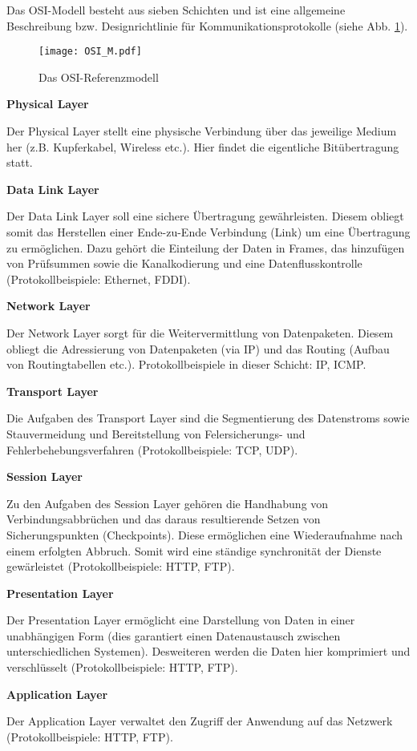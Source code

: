 Das OSI-Modell besteht aus sieben Schichten und ist eine allgemeine Beschreibung
bzw. Designrichtlinie f{\"u}r Kommunikationsprotokolle (siehe Abb.
\ref{fig:OSI_M}).

\begin{figure}[H]
\centering
\texttt{[image: OSI\_M.pdf]}
\caption{Das OSI-Referenzmodell}
\label{fig:OSI_M}
\end{figure}

\textbf{Physical Layer}

Der Physical Layer stellt eine physische Verbindung {\"u}ber das jeweilige
Medium her (z.B. Kupferkabel, Wireless etc.). Hier findet die eigentliche
Bit{\"u}bertragung statt.

\textbf{Data Link Layer}

Der Data Link Layer soll eine sichere {\"U}bertragung gew{\"a}hrleisten. Diesem
obliegt somit das Herstellen einer Ende-zu-Ende Verbindung (Link) um eine
{\"U}bertragung zu erm{\"o}glichen. Dazu geh{\"o}rt die Einteilung der Daten in
Frames, das hinzuf{\"u}gen von Pr{\"u}fsummen sowie die Kanalkodierung und eine
Datenflusskontrolle (Protokollbeispiele: Ethernet, FDDI).

\textbf{Network Layer}

Der Network Layer sorgt f{\"u}r die Weitervermittlung von Datenpaketen. Diesem
obliegt die Adressierung von Datenpaketen (via IP) und das Routing (Aufbau von
Routingtabellen etc.). Protokollbeispiele in dieser Schicht: IP, ICMP.

\textbf{Transport Layer}

Die Aufgaben des Transport Layer sind die Segmentierung des Datenstroms sowie
Stauvermeidung und Bereitstellung von Felersicherungs- und
Fehlerbehebungsverfahren (Protokollbeispiele: TCP, UDP).

\textbf{Session Layer}

Zu den Aufgaben des Session Layer geh{\"o}ren die Handhabung von
Verbindungsabbr{\"u}chen und das daraus resultierende Setzen von
Sicherungspunkten (Checkpoints). Diese erm{\"o}glichen eine Wiederaufnahme
nach einem erfolgten Abbruch. Somit wird eine st{\"a}ndige synchronit{\"a}t der
Dienste gew{\"a}rleistet (Protokollbeispiele: HTTP, FTP).

\textbf{Presentation Layer}

Der Presentation Layer erm{\"o}glicht eine Darstellung von Daten in
einer unabh{\"a}ngigen Form (dies garantiert einen Datenaustausch zwischen
unterschiedlichen Systemen). Desweiteren werden die Daten hier komprimiert und
verschl{\"u}sselt (Protokollbeispiele: HTTP, FTP).

\textbf{Application Layer}

Der Application Layer verwaltet den Zugriff der Anwendung auf das Netzwerk
(Protokollbeispiele: HTTP, FTP).
